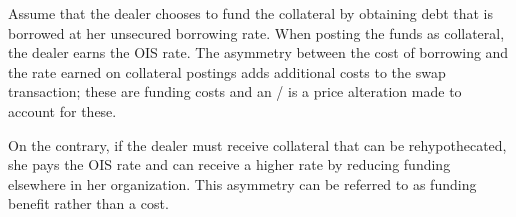 \documentclass[main.tex]{subfiles}
\begin{document}
            Assume that the dealer chooses to fund the collateral by obtaining debt
            that is borrowed at her unsecured borrowing rate.
            When posting the funds as collateral, the dealer earns the OIS rate.
            The asymmetry between the cost of borrowing and the rate earned on collateral postings
            adds additional costs to the swap transaction; 
            these are funding costs and an \FVA/ is a price alteration made to account for these.

            On the contrary, if the dealer must receive collateral that can be rehypothecated,
            she pays the OIS rate and can receive a higher rate
            by reducing funding elsewhere in her organization.
            This asymmetry can be referred to as funding benefit rather than a cost.
\end{document}
